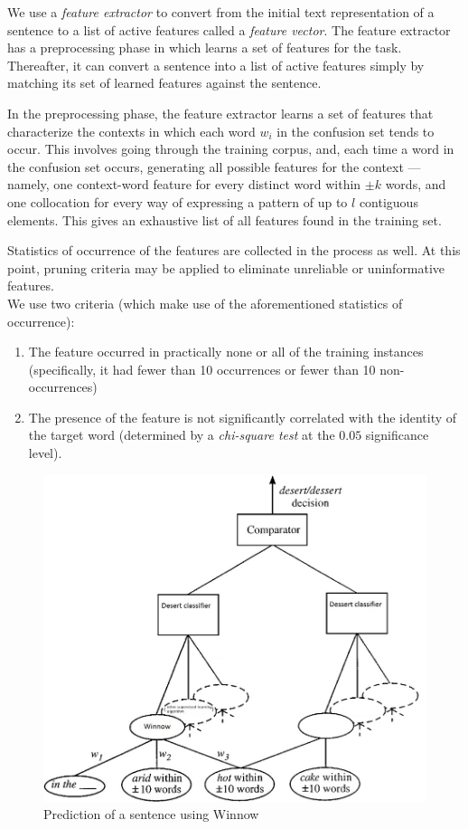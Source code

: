 
We use a \textit{feature extractor} to convert from the initial text
representation of a sentence to a list of active features called a
\textit{feature vector}. The feature extractor has a preprocessing phase in
which learns a set of features for the task. Thereafter, it can convert a
sentence into a list of active features simply by matching its set of learned
features against the sentence.

In the preprocessing phase, the feature extractor learns a set of features that
characterize the contexts in which each word \(w_i\) in the confusion set tends
to occur. This involves going through the training corpus, and, each time a
word in the confusion set occurs, generating all possible features for the
context --- namely, one context-word feature for every distinct word within
\(\pm k\) words, and one collocation for every way of expressing a pattern of
up to \(l\) contiguous elements. This gives an exhaustive list of all features
found in the training set.


Statistics of occurrence of the features are collected in the process as well.
At this point, pruning criteria may be applied to eliminate unreliable or
uninformative features.\\
We use two criteria (which make use of the aforementioned statistics of
occurrence):
\begin{enumerate}
    \item The feature occurred in practically none or all of the training instances (specifically, it had fewer than 10 occurrences or fewer than 10 non-occurrences)
    \item The presence of the feature is not significantly correlated with the identity of the target word (determined by a \textit{chi-square test} at the \(0.05\) significance level).
\end{enumerate}

\begin{figure}[h]
    \centering
    \caption{Prediction of a sentence using Winnow}
    \includegraphics[width=130mm]{img/winnow.jpg}
\end{figure}
\null\vfill
